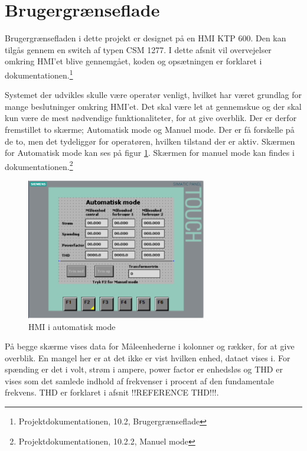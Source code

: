 

\section{Brugergrænseflade}

Brugergrænsefladen i dette projekt er designet på en HMI KTP 600. Den kan tilgås gennem en switch af typen CSM 1277. I dette afsnit vil overvejelser omkring HMI'et blive gennemgået, koden og opsætningen er forklaret i dokumentationen.\footnote{Projektdokumentationen, 10.2, Brugergrænseflade}


Systemet der udvikles skulle være operatør venligt, hvilket har været grundlag for mange beslutninger omkring HMI'et. Det skal være let at gennemskue og der skal kun være de mest nødvendige funktionaliteter, for at give overblik.
Der er derfor fremstillet to skærme; Automatisk mode og Manuel mode. Der er få forskelle på de to, men det tydeliggør for operatøren, hvilken tilstand der er aktiv. Skærmen for Automatisk mode kan ses på figur \ref{fig:HMIAutomatiskModeDesign}. Skærmen for manuel mode kan findes i dokumentationen.\footnote{Projektdokumentationen, 10.2.2, Manuel mode}

\begin{figure}[H] %
	\centering
	\includegraphics[width=0.7\textwidth]{Figure/HMIAutomatiskModeDesign}
	\caption{HMI i automatisk mode}
	\label{fig:HMIAutomatiskModeDesign}
\end{figure}

På begge skærme vises data for Måleenhederne i kolonner og rækker, for at give overblik. En mangel her er at det ikke er vist hvilken enhed, dataet vises i. For spænding er det i volt, strøm i ampere, power factor er enhedsløs og THD er vises som det samlede indhold af frekvenser i procent af den fundamentale frekvens. THD er forklaret i afsnit !!REFERENCE THD!!!.


